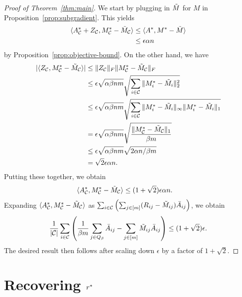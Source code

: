 \begin{proof}[Proof of Theorem~\ref{thm:main}]
We start by plugging in $\tilde{M}$ for $M$ in Proposition~\ref{prop:subgradient}. This yields
\begin{align}
\langle A^*_{\mathcal{C}} + Z_{\mathcal{C}}, M^*_{\mathcal{C}} - \tilde{M}_{\mathcal{C}} \rangle &\leq \langle A^*, M^* - \tilde{M} \rangle \\
 &\leq \epsilon \alpha n
\end{align}
by Proposition~\ref{prop:objective-bound}.
On the other hand, we have 
\begin{align}
|\langle Z_{\mathcal{C}}, M^*_{\mathcal{C}} - \tilde{M}_{\mathcal{C}} \rangle| &\leq \|Z_{\mathcal{C}}\|_F\|M^*_{\mathcal{C}} - \tilde{M}_{\mathcal{C}}\|_F \\
 &\leq \epsilon\sqrt{\alpha\beta nm} \sqrt{\sum_{i \in \mathcal{C}} \|M^*_i - \tilde{M}_i\|_2^2} \\
 &\leq \epsilon\sqrt{\alpha\beta nm} \sqrt{\sum_{i \in \mathcal{C}} \|M^*_i - \tilde{M}_i\|_{\infty}\|M^*_i - \tilde{M}_i\|_1} \\
 &=    \epsilon\sqrt{\alpha\beta nm} \sqrt{\frac{\|M^*_{\mathcal{C}}-\tilde{M}_{\mathcal{C}}\|_1}{\beta m}} \\
 &\leq \epsilon\sqrt{\alpha\beta nm} \sqrt{2\alpha n/\beta m} \\
 &= \sqrt{2}\epsilon\alpha n.
\end{align}
Putting these together, we obtain
\begin{align}
\langle A^*_{\mathcal{C}}, M^*_{\mathcal{C}} - \tilde{M}_{\mathcal{C}} \rangle &\leq (1+\sqrt{2})\epsilon \alpha n.
\end{align}
Expanding $\langle A^*_{\mathcal{C}}, M^*_{\mathcal{C}} - \tilde{M}_{\mathcal{C}} \rangle$ as 
$\sum_{i \in \mathcal{C}}\left( \sum_{j \in [m]} (R_{ij} - \tilde{M}_{ij})\bar{A}_{ij} \right)$,
we obtain 
\[ \frac{1}{|\mathcal{C}|}\sum_{i \in \mathcal{C}}\left( \frac{1}{\beta m}\sum_{j \in Q_{\beta}} \bar{A}_{ij} - \sum_{j \in [m]} \tilde{M}_{ij}\bar{A}_{ij} \right) \leq (1+\sqrt{2})\epsilon. \]
The desired result then follows after scaling down $\epsilon$ 
by a factor of $1+\sqrt{2}$.
\end{proof}

\section{Recovering $r^*$}



